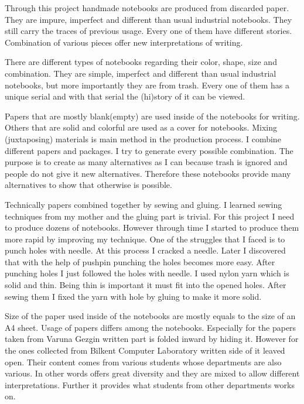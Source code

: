 {%

Through this project handmade notebooks are produced from discarded paper. They are impure, imperfect and different than usual industrial notebooks. They still carry the traces of previous usage. Every one of them have different stories. Combination of various pieces offer new interpretations of writing.

There are different types of notebooks regarding their color, shape, size and combination. They are simple, imperfect and different than usual industrial notebooks, but more importantly they are from trash. Every one of them has a unique serial and with that serial the (hi)story of it can be viewed.

Papers that are mostly blank(empty) are used inside of the notebooks for writing. Others that are solid and colorful are used as a cover for notebooks. Mixing (juxtaposing) materials is main method in the production process. I combine different papers and packages. I try to generate every possible combination. The purpose is to create as many alternatives as I can because trash is ignored and people do not give it new alternatives. Therefore these notebooks provide many alternatives to show that otherwise is possible. 

Technically papers combined together by sewing and gluing. I learned sewing techniques from my mother and the gluing part is trivial. For this project I need to produce dozens of notebooks. However through time I started to produce them more rapid by improving my technique. One of the struggles that I faced is to punch holes with needle. At this process I cracked a needle. Later I discovered that with the help of pushpin punching the holes becomes more easy. After punching holes I just followed the holes with needle. I used nylon yarn which is solid and thin. Being thin is important it must fit into the opened holes. After sewing them I fixed the yarn with hole by gluing to make it more solid.


Size of the paper used inside of the notebooks are mostly equals to the size of an A4 sheet. Usage of papers differs among the notebooks. Especially for the papers taken from Varuna Gezgin written part is folded inward by hiding it. However for the ones collected from Bilkent Computer Laboratory written side of it leaved open. Their content comes from various students whose departments are also various. In other words offers great diversity and they are mixed to allow different interpretations. Further it provides what students from other departments works on. %

}
